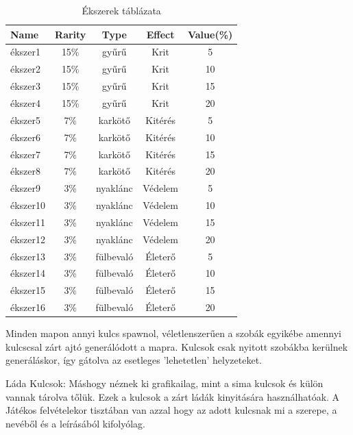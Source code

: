 \begin{table}[!ht]
\centering
\caption{Ékszerek táblázata}
\label{tab:table5}
\begin{tabular}{|l|c|c|c|c|}
\hline
 Name & Rarity & Type & Effect & Value(\%) \\
\hline
 ékszer1 & 15\% & gyűrű & Krit & 5 \\
\hline
 ékszer2 & 15\% & gyűrű & Krit & 10 \\
\hline
 ékszer3 & 15\% & gyűrű & Krit & 15\\
\hline
 ékszer4 & 15\% & gyűrű & Krit  & 20\\
\hline
 ékszer5 & 7\% & karkötő & Kitérés & 5 \\
\hline
 ékszer6 & 7\% & karkötő & Kitérés & 10 \\
\hline
 ékszer7 & 7\% & karkötő & Kitérés & 15\\
\hline
 ékszer8 & 7\% & karkötő & Kitérés  & 20\\
 \hline
 ékszer9 & 3\% & nyaklánc & Védelem & 5 \\
\hline
 ékszer10 & 3\% & nyaklánc & Védelem & 10 \\
\hline
 ékszer11 & 3\% & nyaklánc & Védelem & 15\\
\hline
 ékszer12 & 3\% & nyaklánc & Védelem  & 20\\
 \hline
 ékszer13 & 3\% & fülbevaló & Életerő & 5 \\
\hline
 ékszer14 & 3\% & fülbevaló & Életerő & 10 \\
\hline
 ékszer15 & 3\% & fülbevaló & Életerő & 15\\
\hline
 ékszer16 & 3\% & fülbevaló & Életerő  & 20\\
 \hline
\end{tabular}
\end{table}

\newpage


Minden mapon annyi kulcs spawnol, véletlenszerűen a szobák egyikébe amennyi kulcs\-csal zárt ajtó generálódott a mapra.
Kulcsok csak nyitott szobákba kerülnek generáláskor, így gátolva az esetleges 'lehetetlen' helyzeteket.

Láda Kulcsok:
Máshogy néznek ki grafikailag, mint a sima kulcsok és külön vannak tárolva tőlük. Ezek a kulcsok a zárt ládák kinyitására használhatóak.
A Játékos felvételekor tisztában van azzal hogy az adott kulcsnak mi a szerepe, a nevéből és a leírásából kifolyólag.

